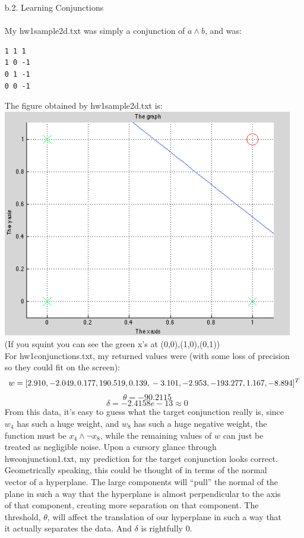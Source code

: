 \begin{enumerate}
\begin{enumerate}
        \item[b.2.] Learning Conjunctions\\\\
                My hw1sample2d.txt was simply a conjunction of $a \land b$, and was:
\begin{verbatim}
1 1 1
1 0 -1
0 1 -1
0 0 -1
\end{verbatim}
                The figure obtained by hw1sample2d.txt is:\\
                \includegraphics[scale=0.5]{learnConjunctions}\\
                (If you squint you can see the green x's at (0,0),(1,0),(0,1))\\
                For hw1conjunctions.txt, my returned values were (with some loss of precision so they could fit on the screen):
                    $$w = [2.910,
                          -2.049,
                           0.177,
                           190.519,
                           0.139,\\
                          -3.101,
                          -2.953,
                          -193.277,
                           1.167,
                          -8.894]^T$$
                    $$\theta = -90.2115$$
                    $$\delta = -2.4158e-13 \approx 0$$
               From this data, it's easy to guess what the target conjunction really is, since $w_4$ has such a huge weight, and $w_8$ has such a huge negative weight, the function must be $x_4 \land \neg x_8$, while the remaining values of $w$ can just be treated as negligible noise. Upon a cursory glance through hwconjunction1.txt, my prediction for the target conjunction looks correct. Geometrically speaking, this could be thought of in terms of the normal vector of a hyperplane. The large components will ``pull'' the normal of the plane in such a way that the hyperplane is almost perpendicular to the axis of that component, creating more separation on that component. The threshold, $\theta$, will affect the translation of our hyperplane in such a way that it actually separates the data. And $\delta$ is rightfully $0$.\\

\end{enumerate}
\end{enumerate}
